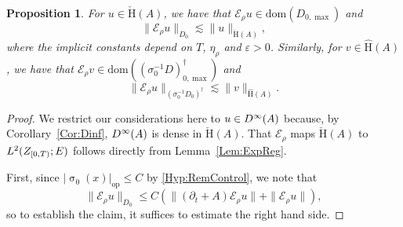 \documentclass[a4paper,10pt,reqno]{amsart}
\newcommand{\sym}{\upsigma}
\newcommand{\modulus}[1]{|#1|}
\newcommand{\norm}[1]{\| #1 \|}%
\newcommand{\Lp}[2][{}]{{\rm L}^{#2}_{\rm #1}}%
\newcommand{\Dk}[2][{}]{{\rm D}^{#2}_{\rm #1}}%
\newcommand{\checkH}{\check{\mathrm{H}}}
\newcommand{\hatH}{\hat{\mathrm{H}}}
\newcommand{\dom}{\mathrm{dom}}
\newcommand{\ext}{\mathcal{E}}
\renewcommand{\epsilon}{\varepsilon}
\newtheorem{proposition}[theorem]{Proposition}
\theoremstyle{definition}
\begin{document}
\begin{proposition}
\label{Prop:ModelBnd}
For $u \in \checkH(A)$, we have that $\ext_\rho u \in \dom( D_{0,\max})$ and
$$ \norm{\ext_\rho u}_{D_0} \lesssim \norm{u}_{\checkH(A)},$$
where the implicit constants depend on $T$, $\eta_\rho$ and $\epsilon > 0$.
Similarly, for $v \in \hatH(A)$, we have that $\ext_\rho v \in \dom( (\sigma_0^{-1} D)^\dagger_{0,\max})$ and
$$ \norm{\ext_\rho u}_{(\sigma_0^{-1} D_0)^\dagger} \lesssim \norm{v}_{\hatH(A)}.$$
\end{proposition}
\begin{proof}
We restrict our considerations here to $u \in \Dk{\infty}(A)$ because, by Corollary~\ref{Cor:Dinf}, $\Dk{\infty}(A)$ is dense in $\checkH(A)$.
That $\ext_\rho$ maps $\checkH(A)$ to $\Lp{2}(Z_{[0,T)};E)$ follows directly from Lemma~\ref{Lem:ExpReg}.

First, since $\modulus{\sym_0(x)}_{\mathrm{op}} \leq C$ by \ref{Hyp:RemControl}, we note that
$$ \norm{\ext_\rho u}_{D_0} \leq C (\norm{ (\partial_t + A) \ext_\rho u} + \norm{ \ext_\rho u}),$$
so to establish the claim, it suffices to estimate the right hand side.


\end{proof}
\end{document}
